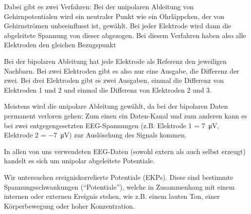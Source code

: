 \documentclass[10pt]{article}
\begin{document}
Dabei gibt es zwei Verfahren: Bei der unipolaren Ableitung von Gehirnpotentialen wird ein neutraler Punkt wie ein Ohrläppchen, der von Gehirnströmen unbeeinflusst ist, gewählt. 
Bei jeder Elektrode wird dann die abgeleitete Spannung von dieser abgezogen.
Bei diesem Verfahren haben also alle Elektroden den gleichen Bezugspunkt

Bei der bipolaren Ableitung hat jede Elektrode als Referenz den jeweiligen Nachbarn.
Bei zwei Elektroden gibt es also nur eine Ausgabe, die Differenz der zwei.
Bei drei Elektroden gibt es zwei Ausgaben, einmal die Differenz von Elektroden 1 und 2 und einmal die Differenz von Elektroden 2 und 3. \cite{EEGHausarbeit}

Meistens wird die unipolare Ableitung gewählt, da bei der bipolaren Daten permanent verloren gehen: Zum einen ein Daten-Kanal und zum anderen kann es bei zwei entgegengesetzten EEG-Spannungen (z.B. Elektrode 1 = \SI{7}{\micro\volt}, Elektrode 2 = \SI{-7}{\micro\volt}) zur Auslöschung des Signals kommen. \cite{EEGHausarbeit}

In allen von uns verwendeten EEG-Daten (sowohl extern als auch selbst erzeugt) handelt es sich um unipolar abgeleitete Potentiale.



Wir untersuchen ereigniskorrelierte Potentiale (EKPs). 
Diese sind bestimmte Spannungsschwankungen (\enquote{Potentiale}), welche in Zusammenhang mit einem internen oder externen Ereignis stehen, wie z.B. einem lauten Ton, einer Körperbewegung oder hoher Konzentration.  %
\end{document}
